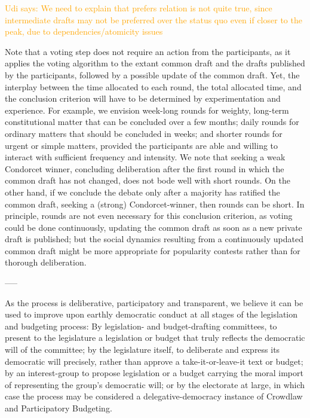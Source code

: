 \documentclass{llncs}
\newcommand{\udi}[1]{\textcolor{orange}{Udi says: #1}}
\begin{document}
\udi{We need to explain that prefers relation is not quite true, since intermediate drafts may not be preferred over the status quo even if closer to the peak, due to dependencies/atomicity issues}

Note that a voting step does not require an action from the participants, as it applies the voting algorithm to the extant common draft and the drafts published by the participants, followed by a possible update of the common draft. Yet, the interplay between the time allocated to each round, the total allocated time, and the conclusion criterion will have to be determined by experimentation and experience.  For example, we envision week-long rounds for weighty, long-term constitutional matter that can be concluded over a few months; daily rounds for ordinary matters that should be concluded in weeks; and shorter rounds for urgent or simple matters, provided the participants are able and willing to interact with sufficient frequency and intensity.  We note that seeking a weak Condorcet winner, concluding deliberation after the first round in which the common draft has not changed, does not bode well with short rounds.  On the other hand, if we conclude the debate only after a majority has ratified the common draft, seeking a (strong) Condorcet-winner, then rounds can be short. In principle, rounds are not even necessary for this conclusion criterion, as voting could be done continuously, updating the common draft as soon as a new private draft is published; but the social dynamics resulting from a continuously updated common draft might be more appropriate for popularity contests rather than for thorough deliberation. 




-----

As the process is deliberative, participatory and transparent, we believe it can be used to improve upon earthly democratic conduct at all stages of the legislation and budgeting process: By  legislation- and budget-drafting committees, to present to the legislature a legislation or budget that truly reflects the democratic will of the committee; by the legislature itself, to deliberate and express its democratic will precisely, rather than approve a take-it-or-leave-it text or budget;
by an interest-group to propose legislation or a budget carrying the moral import of representing the group's democratic will; or by the electorate at large, in which case the process may be considered a delegative-democracy instance of Crowdlaw and Participatory Budgeting.
\end{document}
